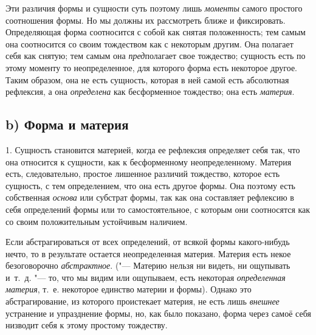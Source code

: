 Эти различия формы и сущности суть поэтому лишь
{\em моменты} самого простого соотношения формы. Но мы
должны их рассмотреть ближе и фиксировать. Определяющая форма соотносится с
собой как снятая положенность; тем самым она соотносится со своим
тождеством как с некоторым другим. Она полагает себя как снятую; тем самым
она {\em пред}полагает свое тождество; сущность есть по
этому моменту то неопределенное, для которого форма есть некоторое другое.
Таким образом, она не есть сущность, которая в ней самой есть абсолютная
рефлексия, а она {\em определена} как бесформенное
тождество; она есть {\em материя}.

\subsection[b) Форма и материя]{b) Форма и материя}
1. Сущность становится материей, когда ее
рефлексия определяет себя так, что она относится к сущности, как к
бесформенному неопределенному. Материя есть, следовательно, простое
лишенное различий тождество, которое есть сущность, с тем определением, что
она есть другое формы. Она поэтому есть собственная
{\em основа} или субстрат формы, так как она составляет
рефлексию в себя определений формы или то самостоятельное, с которым они
соотносятся как со своим положительным устойчивым наличием.

Если абстрагироваться от всех определений, от всякой формы какого-нибудь
нечто, то в результате остается неопределенная материя. Материя есть некое
безоговорочно {\em абстрактное}. ("--- Материю нельзя ни
видеть, ни ощупывать и~т.~д. "--- то, что мы видим или ощупываем, есть
некоторая {\em определенная материя}, т.~е. некоторое
единство материи и формы). Однако это абстрагирование, из которого
проистекает материя, не есть лишь {\em внешнее}
устранение и упразднение формы, но, как было показано, форма через самоё
себя низводит себя к этому простому тождеству.

